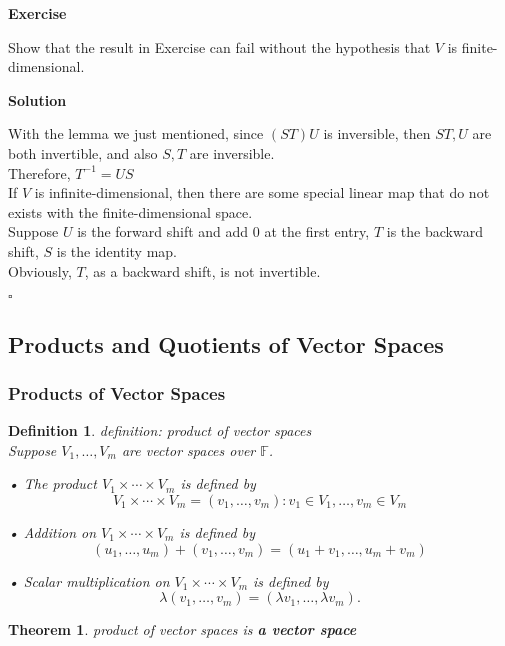 \documentclass{article}
\newtheorem{theorem}{Theorem}[subsection]
\newtheorem{definition}{Definition}[subsection]
\newenvironment{exercise}{%
{\textbf{Exercise\\}
    }
}{
}
\newenvironment{solution}{%
{
    \textbf{Solution\\}
    }
}{
  \hfill $\square$ 
  \par\bigskip 
}
\newcommand{\FF}{\mathbb{F}}
\begin{document}
\begin{CJK}{UTF8}{gkai}
\begin{exercise}
    Show that the result in Exercise can fail without the hypothesis that $V$ is finite-dimensional.
\end{exercise}

\begin{solution}
    With the lemma we just mentioned, since $(ST)U$ is inversible, then $ST, U$ are both invertible, and also $S,T$ are inversible.\\

    Therefore, $T^{-1} = US$\\

    If $V$ is infinite-dimensional, then there are some special linear map that do not exists with the finite-dimensional space.\\
    
    Suppose $U$ is the forward shift and add $0$ at the first entry, $T$ is the backward shift, $S$ is the identity map.\\

    Obviously, $T$, as a backward shift, is not invertible.
\end{solution}

\subsection{Products and Quotients of Vector Spaces}

\subsubsection{Products of Vector Spaces}

\begin{definition}
    definition: product of vector spaces\\

    Suppose $V_1,\ldots,V_m$ are vector spaces over $\FF$.

    • The product $V_1 \times\cdots\times V_m$ is defined by
    \[V_1 \times\cdots\times V_m ={(v_1,\ldots,v_m) : v_1 \in V_1,\ldots,v_m \in V_m}\]

    • Addition on $V_1 \times\cdots\times V_m$ is defined by
    \[(u_1, \ldots,u_m) + (v_1,\ldots,v_m) = (u_1 +v_1,\ldots,u_m +v_m)\]

    • Scalar multiplication on $V_1 \times \cdots \times V_m$ is defined by
    \[\lambda(v_1,\ldots,v_m) = (\lambda v_1,\ldots, \lambda v_m).\]

\end{definition}

\begin{theorem}
    product of vector spaces is \textbf{a vector space}\\


\end{theorem}
\end{CJK}
\end{document}
